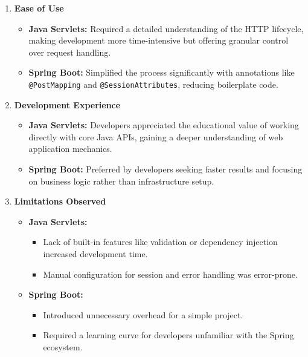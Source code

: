 \begin{enumerate}
    \item \textbf{Ease of Use}
    \begin{itemize}
        \item \textbf{Java Servlets:} Required a detailed understanding of the HTTP lifecycle, making development more time-intensive but offering granular control over request handling.
        \item \textbf{Spring Boot:} Simplified the process significantly with annotations like \texttt{@PostMapping} and \texttt{@SessionAttributes}, reducing boilerplate code.
    \end{itemize}

    \item \textbf{Development Experience}
    \begin{itemize}
        \item \textbf{Java Servlets:} Developers appreciated the educational value of working directly with core Java APIs, gaining a deeper understanding of web application mechanics.
        \item \textbf{Spring Boot:} Preferred by developers seeking faster results and focusing on business logic rather than infrastructure setup.
    \end{itemize}

    \item \textbf{Limitations Observed}
    \begin{itemize}
        \item \textbf{Java Servlets:}
        \begin{itemize}
            \item Lack of built-in features like validation or dependency injection increased development time.
            \item Manual configuration for session and error handling was error-prone.
        \end{itemize}
        \item \textbf{Spring Boot:}
        \begin{itemize}
            \item Introduced unnecessary overhead for a simple project.
            \item Required a learning curve for developers unfamiliar with the Spring ecosystem.
        \end{itemize}
    \end{itemize}
\end{enumerate}

